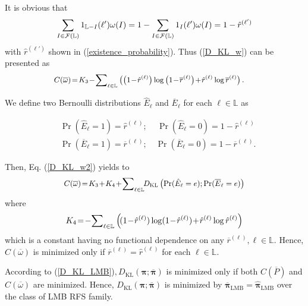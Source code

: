 \documentclass[journal]{IEEEtran}
\newcommand{\bpi}{{\boldsymbol\pi}}
\begin{document}
{It is obvious that
\begin{equation}
{\small
\sum_{I\in\mathcal{F}(\mathbb{L)}}1_{\mathbb{L}-I}(\ell')\omega(I)=1-\sum_{I\in\mathcal{F}(\mathbb{L)}}1_{I}(\ell')\omega(I)=1-\hat r^{(\ell')}}
\end{equation}
with $\hat r^{(\ell')}$ shown in (\ref{existence_probability}).
Thus (\ref{D_KL_w}) can be  presented as
\begin{equation}\label{D_KL_w2}
{\small
\begin{split}
&\!\!C(\overline\omega)\!=\!K_3\!-\!{\sum}_{\ell\in\mathbb{L}}\left(\left(1\!-\!\hat r^{(\ell)}\right)\log\left({1\!-\!\overline r^{(\ell)}}\right)\!+\!\hat r^{(\ell)}\log{\overline r^{(\ell)}}\right).
\end{split}}
\end{equation}

We define two Bernoulli distributions $\hat E_\ell$ and $\overline E_{\ell}$ for each $\ell\in\mathbb{L}$ as
\begin{small}
\begin{align}
&\Pr(\hat E_\ell=1)=\hat r^{(\ell)};\,\,\,\,\,\,\, \Pr(\hat E_\ell=0)=1-\hat r^{(\ell)}\\
&\Pr(\overline E_\ell=1)=\overline r^{(\ell)};\,\,\,\,\,\,\Pr(\overline E_\ell=0)=1-\overline r^{(\ell)}.
\end{align}\end{small}
Then, Eq. (\ref{D_KL_w2}) yields to
\begin{equation}\label{D_KL_w3}
{\small
\begin{split}
&C(\overline\omega)\!=\!
K_3\!+\!K_4\!+\!{\sum}_{\ell\in\mathbb{L}}\!D_{\text{KL}}\left(\Pr(\hat E_\ell=e);\Pr(\overline E_\ell=e)\right)\\
\end{split}}
\end{equation}
where 
\begin{equation}
{\small
K_4\!=\!-{\sum}_{\ell\in\mathbb{L}}\left(\!(1\!-\!\hat r^{(\ell)})\log({1\!-\!\hat r^{(\ell)}})\!+\!\hat r^{(\ell)}\log{\hat r^{(\ell)}}\right)}
\end{equation}
which is a constant having no functional dependence on any $\overline r^{(\ell)}, \ell\in\mathbb{L}$. Hence,  $C(\overline\omega)$ is minimized only if
$\overline r^{(\ell)}\!\!=\!\hat r^{(\ell)}$  for each $\ell\!\in\!\mathbb{L}$.

According to (\ref{D_KL_LMB})$, D_{\text{KL}}(\bpi;\overline\bpi)$ is minimized only if both $C(\overline P)$ and $C(\overline\omega)$  are minimized. Hence, $D_{\text{KL}}(\bpi;\overline\bpi)$ is minimized by $\overline\bpi_{\text{LMB}}=\hat \bpi_{\text{LMB}}$ over the class of LMB RFS family.
}
\end{document}
